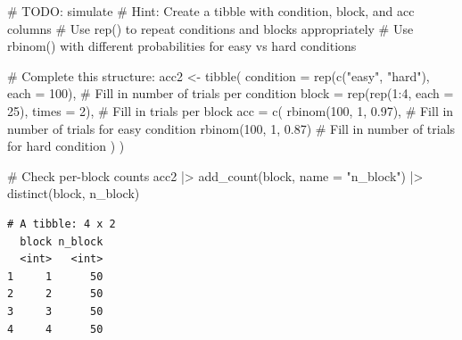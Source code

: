\documentclass[
  letterpaper,
  DIV=11,
  numbers=noendperiod]{scrartcl}
\newenvironment{Shaded}{\begin{snugshade}}{\end{snugshade}}
\newcommand{\AlertTok}[1]{\textcolor[rgb]{0.68,0.00,0.00}{#1}}
\newcommand{\AttributeTok}[1]{\textcolor[rgb]{0.40,0.45,0.13}{#1}}
\newcommand{\CommentTok}[1]{\textcolor[rgb]{0.37,0.37,0.37}{#1}}
\newcommand{\DecValTok}[1]{\textcolor[rgb]{0.68,0.00,0.00}{#1}}
\newcommand{\FloatTok}[1]{\textcolor[rgb]{0.68,0.00,0.00}{#1}}
\newcommand{\FunctionTok}[1]{\textcolor[rgb]{0.28,0.35,0.67}{#1}}
\newcommand{\NormalTok}[1]{\textcolor[rgb]{0.00,0.23,0.31}{#1}}
\newcommand{\OtherTok}[1]{\textcolor[rgb]{0.00,0.23,0.31}{#1}}
\newcommand{\SpecialCharTok}[1]{\textcolor[rgb]{0.37,0.37,0.37}{#1}}
\newcommand{\StringTok}[1]{\textcolor[rgb]{0.13,0.47,0.30}{#1}}
\begin{document}
\begin{Shaded}
\begin{Highlighting}[]
\CommentTok{\# }\AlertTok{TODO}\CommentTok{: simulate}
\CommentTok{\# Hint: Create a tibble with condition, block, and acc columns}
\CommentTok{\# Use rep() to repeat conditions and blocks appropriately}
\CommentTok{\# Use rbinom() with different probabilities for easy vs hard conditions}

\CommentTok{\# Complete this structure:}
\NormalTok{acc2 }\OtherTok{\textless{}{-}} \FunctionTok{tibble}\NormalTok{(}
  \AttributeTok{condition =} \FunctionTok{rep}\NormalTok{(}\FunctionTok{c}\NormalTok{(}\StringTok{"easy"}\NormalTok{, }\StringTok{"hard"}\NormalTok{), }\AttributeTok{each =} \DecValTok{100}\NormalTok{),  }\CommentTok{\# Fill in number of trials per condition}
  \AttributeTok{block =} \FunctionTok{rep}\NormalTok{(}\FunctionTok{rep}\NormalTok{(}\DecValTok{1}\SpecialCharTok{:}\DecValTok{4}\NormalTok{, }\AttributeTok{each =} \DecValTok{25}\NormalTok{), }\AttributeTok{times =} \DecValTok{2}\NormalTok{),   }\CommentTok{\# Fill in trials per block}
  \AttributeTok{acc =} \FunctionTok{c}\NormalTok{(}
    \FunctionTok{rbinom}\NormalTok{(}\DecValTok{100}\NormalTok{, }\DecValTok{1}\NormalTok{, }\FloatTok{0.97}\NormalTok{),  }\CommentTok{\# Fill in number of trials for easy condition}
    \FunctionTok{rbinom}\NormalTok{(}\DecValTok{100}\NormalTok{, }\DecValTok{1}\NormalTok{, }\FloatTok{0.87}\NormalTok{)   }\CommentTok{\# Fill in number of trials for hard condition}
\NormalTok{  )}
\NormalTok{)}

\CommentTok{\# Check per{-}block counts}
\NormalTok{acc2 }\SpecialCharTok{|\textgreater{}}
  \FunctionTok{add\_count}\NormalTok{(block, }\AttributeTok{name =} \StringTok{"n\_block"}\NormalTok{) }\SpecialCharTok{|\textgreater{}}
  \FunctionTok{distinct}\NormalTok{(block, n\_block)}
\end{Highlighting}
\end{Shaded}

\begin{verbatim}
# A tibble: 4 x 2
  block n_block
  <int>   <int>
1     1      50
2     2      50
3     3      50
4     4      50
\end{verbatim}
\end{document}

